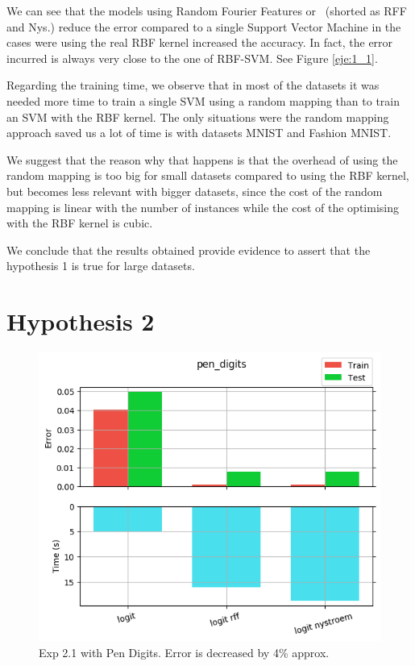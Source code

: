 \begin{pre-delivery}
We can see that the models using Random Fourier Features or \Nys\ (shorted as
RFF and Nys.) reduce the error compared to a single Support Vector Machine
in the cases were using the real RBF kernel increased the
accuracy. In fact, the error incurred is always very close to the one of
RBF-SVM. See Figure \ref{eje:1_1}.

Regarding the training time, we observe that in most of the datasets it was
needed more time to train a single SVM using a random mapping than to train
an SVM with the RBF kernel. The only situations were the random mapping approach
saved us a lot of time is with datasets MNIST and Fashion MNIST.

We suggest that the reason why that happens is that the overhead of using
the random mapping is too big for small datasets compared to using the RBF
kernel, but becomes less relevant with bigger datasets, since the cost of
the random mapping is linear with the number of instances while the cost of the
optimising with the RBF kernel is cubic.

We conclude that the results obtained provide evidence to assert that the
hypothesis 1 is true for large datasets.

\section*{Hypothesis 2}
\label{disc:h2}

\begin{figure}[th]
\centering
\includegraphics[scale=0.6]{Figures/2_1/pen_digits}
\decoRule
\caption{Exp 2.1 with Pen Digits. Error is decreased by 4\% approx.}
\label{eje:2_1.1}
\end{figure}


\end{pre-delivery}
